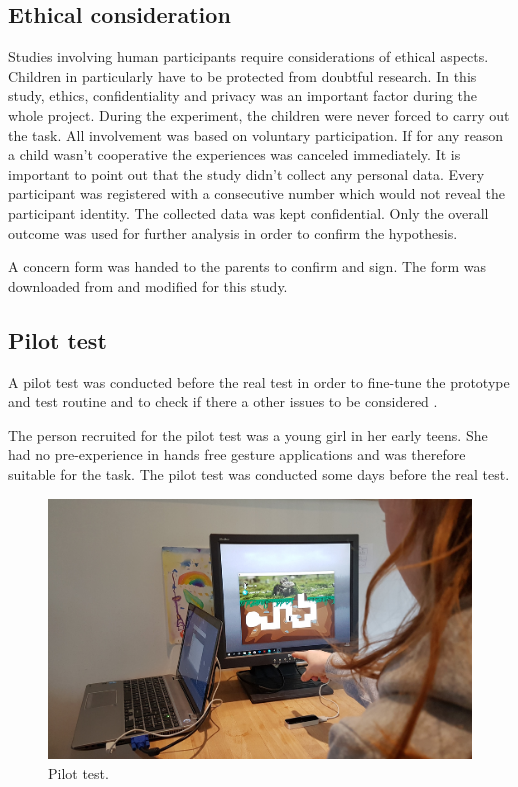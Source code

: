 \subsection{Ethical consideration}
\label{sec:ethical}

Studies involving human participants require considerations of ethical aspects. Children in particularly have to be protected from doubtful research. In this study, ethics, confidentiality and privacy was an important factor during the whole project.
During the experiment, the children were never forced to carry out the task. All involvement was based on voluntary participation. If for any reason a child wasn't cooperative the experiences was canceled immediately. 
It is important to point out that the study didn't collect any personal data. Every participant was registered with a consecutive number which would not reveal the participant identity. The collected data was kept confidential. Only the overall outcome was used for further analysis in order to confirm the hypothesis.  

A concern form was handed to the parents to confirm and sign. The form was downloaded from \cite{Usabilitygov} and modified for this study.

\subsection{Pilot test}

A pilot test was conducted before the real test in order to fine-tune the prototype and test routine and to check if there a other issues to be considered \cite{schade2015}.

The person recruited for the pilot test was a young girl in her early teens. She had no pre-experience in hands free gesture applications and was therefore suitable for the task.
The pilot test was conducted some days before the real test.

\begin{figure}[h]  %
  \centering
  \includegraphics[width=.5\textwidth]{figures/pilottest.jpg}
  \caption[Pilot test.]{Pilot test.}
  \label{fig:pilottest}
\end{figure}

